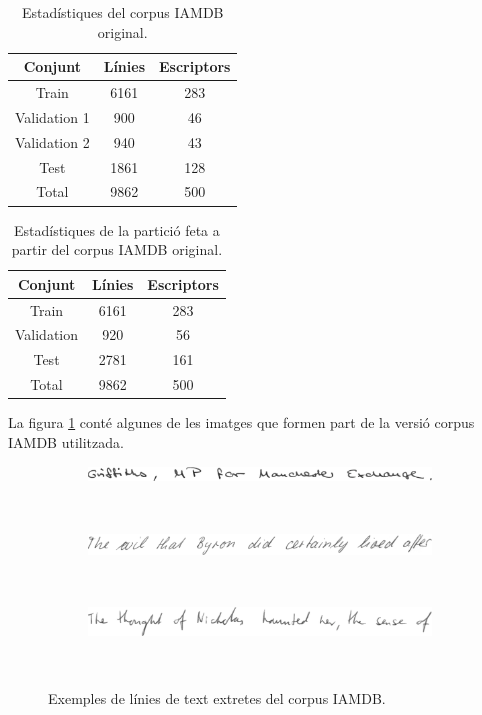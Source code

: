 \begin{table}
\centering
\begin{tabular}{|c|c|c|}
\hline
Conjunt & Línies & Escriptors \\
\hline
Train & 6161 & 283 \\
Validation 1 & 900 & 46 \\
Validation 2	 & 940 & 43 \\
Test & 1861 & 128\\
\hline
Total & 9862 & 500\\
\hline
\end{tabular}
\caption{Estadístiques del corpus IAMDB original.}\label{tab:iamdb_original}
\end{table}

\begin{table}
\centering
\begin{tabular}{|c|c|c|}
\hline
Conjunt & Línies & Escriptors \\
\hline
Train & 6161 & 283 \\
Validation & 920 & 56 \\
Test & 2781 & 161\\
\hline
Total & 9862 & 500\\
\hline
\end{tabular}
\caption{Estadístiques de la partició feta a partir del corpus IAMDB original.}\label{tab:iamdb_used}
\end{table}

La figura \ref{fig:iamdb_examples} conté algunes de les imatges que formen part de la versió corpus IAMDB utilitzada.
\begin{figure}
\centering
\begin{subfigure}[b]{0.9\textwidth}
\centering
\includegraphics[width=\textwidth]{images/iamdb_a01-000u-06.eps}
\end{subfigure}\\
\begin{subfigure}[b]{0.9\textwidth}
\centering
\includegraphics[width=\textwidth]{images/iamdb_c01-066-00.eps}
\end{subfigure}\\
\begin{subfigure}[b]{0.9\textwidth}
\centering
\includegraphics[width=\textwidth]{images/iamdb_p06-248-00.eps}
\end{subfigure}\\
\caption{Exemples de línies de text extretes del corpus IAMDB.}\label{fig:iamdb_examples}
\end{figure}

